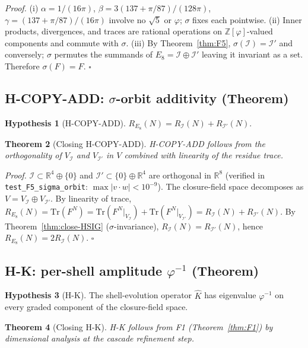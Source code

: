 \documentclass[11pt]{article}
\theoremstyle{plain}
\newtheorem{theorem}{Theorem}[section]
\theoremstyle{definition}
\newtheorem{hypothesis}[theorem]{Hypothesis}
\theoremstyle{remark}
\newcommand{\Zphi}{\mathbb{Z}[\varphi]}
\newcommand{\Ical}{\mathcal{I}}
\begin{document}
\noindent\emph{Proof.}
(i) $\alpha = 1/(16\pi)$, $\beta = 3(137+\pi/87)/(128\pi)$, $\gamma = (137+\pi/87)/(16\pi)$ involve no $\sqrt 5$ or $\varphi$; $\sigma$ fixes each pointwise. (ii) Inner products, divergences, and traces are rational operations on $\Zphi$-valued components and commute with $\sigma$. (iii) By Theorem~\ref{thm:F5}, $\sigma(\Ical) = \Ical'$ and conversely; $\sigma$ permutes the summands of $E_8 = \Ical \oplus \Ical'$ leaving it invariant as a set. Therefore $\sigma(F) = F$. \hfill$\square$

\subsection{H-COPY-ADD: $\sigma$-orbit additivity (Theorem)}\label{sec:discharge-HCOPYADD}

\begin{hypothesis}[H-COPY-ADD]
$R_{E_8}(N) = R_{\Ical}(N) + R_{\Ical'}(N)$.
\end{hypothesis}

\begin{theorem}[Closing H-COPY-ADD]\label{thm:close-HCOPYADD}
H-COPY-ADD follows from the orthogonality of $V_{\Ical}$ and $V_{\Ical'}$ in $V$ combined with linearity of the residue trace.
\end{theorem}

\noindent\emph{Proof.}
$\Ical \subset \mathbb{R}^4 \oplus \{0\}$ and $\Ical' \subset \{0\} \oplus \mathbb{R}^4$ are orthogonal in $\mathbb{R}^8$ (verified in \texttt{test\_F5\_sigma\_orbit}: $\max |v \cdot w| < 10^{-9}$). The closure-field space decomposes as $V = V_{\Ical} \oplus V_{\Ical'}$. By linearity of trace, $R_{E_8}(N) = \mathrm{Tr}(F^N) = \mathrm{Tr}(F^N|_{V_{\Ical}}) + \mathrm{Tr}(F^N|_{V_{\Ical'}}) = R_{\Ical}(N) + R_{\Ical'}(N)$. By Theorem~\ref{thm:close-HSIG} ($\sigma$-invariance), $R_{\Ical}(N) = R_{\Ical'}(N)$, hence $R_{E_8}(N) = 2 R_{\Ical}(N)$. \hfill$\square$

\subsection{H-K: per-shell amplitude $\varphi^{-1}$ (Theorem)}\label{sec:discharge-HK}

\begin{hypothesis}[H-K]
The shell-evolution operator $\widehat K$ has eigenvalue $\varphi^{-1}$ on every graded component of the closure-field space.
\end{hypothesis}

\begin{theorem}[Closing H-K]\label{thm:close-HK}
H-K follows from F1 (Theorem~\ref{thm:F1}) by dimensional analysis at the cascade refinement step.
\end{theorem}
\end{document}
